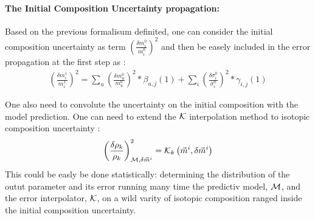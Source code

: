 \documentclass[dvips,12pt]{article}
\begin{document}



\paragraph{The Initial Composition Uncertainty propagation:\\}
Based on the previous formalisum definited, one
can consider the initial composition uncertainty
as term $\left( \frac{\delta m_i^{0}}{m_i^{0}} \right)^{2}$
and then be easely included in the error
propagation  at the first step as :\\
\begin{align}
  \left( \frac{\delta m_i^{1}}{m_i^{1}} \right)^{2} = \sum_{u}\left( \frac{\delta m_u^{0}}{m_u^{0}} \right)^{2} *\beta_{u,j}(1) + \sum_{i}\left( \frac{\delta \sigma_i^{0}}{\sigma_i^{0}} \right)^{2} *\gamma_{i,j}(1) \label{eq:dm0}
\end{align}



One also need to convolute the uncertainty on the
initial composition with the model prediction.
One can need to extend the ${\cal K}$ interpolation method to isotopic composition uncertainty :
\begin{align}
  \left( \frac{\delta \rho_k}{\rho_k} \right)^{2} _{{\cal M}, \delta \vec{m}^{i}} = {\cal K}_k \left( \vec{m}^{i} , \delta\vec{m}^{i} \right)
\end{align}
This could be easly be done statistically:
determining the distribution of the outut
parameter and its error running many time the
predictiv model, ${\cal M}$, and the error
interpolator, ${\cal K}$, on a wild varity of
isotopic composition ranged inside the initial
composition uncertainty.
\end{document}
